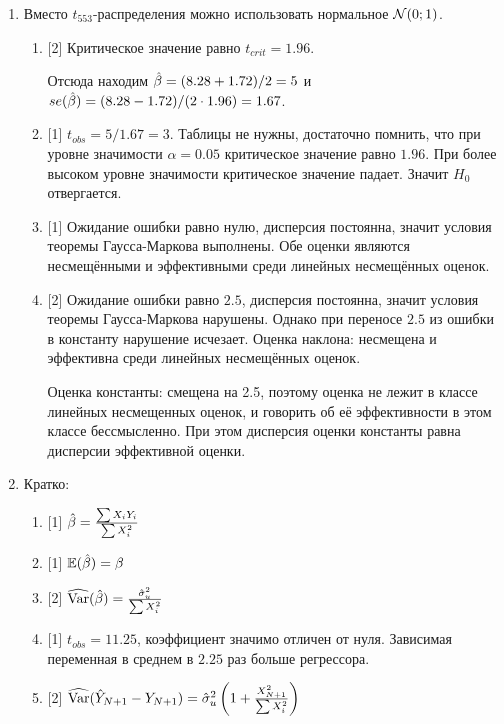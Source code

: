 \begin{enumerate}
    \item Вместо $t_{553}$-распределения можно использовать нормальное $\mathcal{N}(0;1)$.
\begin{enumerate}
    \item {[2]} Критическое значение равно $t_{crit} = 1.96$. 

    Отсюда находим $\hat{\beta} = (8.28 + 1.72)/2=5$ и $se(\hat{\beta}) = (8.28 - 1.72)/(2\cdot 1.96) = 1.67$.
    \item {[1]} $t_{obs} = 5/1.67 = 3$. Таблицы не нужны, достаточно помнить, 
    что при уровне значимости $\alpha=0.05$ критическое значение равно $1.96$. 
    При более высоком уровне значимости критическое значение падает. Значит $H_0$ отвергается. 

    \item {[1]} Ожидание ошибки равно нулю, дисперсия постоянна, значит условия теоремы Гаусса-Маркова выполнены. 
    Обе оценки являются несмещёнными и эффективными среди линейных несмещённых оценок. 

    \item {[2]} Ожидание ошибки равно $2.5$, дисперсия постоянна, значит условия теоремы Гаусса-Маркова нарушены.
    Однако при переносе $2.5$ из ошибки в константу нарушение исчезает. 
    Оценка наклона: несмещена и эффективна среди линейных несмещённых оценок.

    Оценка константы: смещена на 2.5, поэтому оценка не лежит в классе линейных несмещенных оценок, 
    и говорить об её эффективности в этом классе бессмысленно. 
    При этом дисперсия оценки константы равна дисперсии эффективной оценки.

\end{enumerate}

\item Кратко:
\begin{enumerate}
    \item {[1]} $\hat{\beta} = \frac{\sum X_i Y_i}{\sum X_i^2}$
    \item {[1]} $\operatorname{\mathbb{E}}(\hat{\beta}) = \beta$
    \item {[2]} $\operatorname{\widehat{\operatorname{Var}}}(\hat{\beta}) = \frac{\hat\sigma^2_u}{\sum X_i^2}$
    \item {[1]} $t_{obs} = 11.25$, коэффициент значимо отличен от нуля. 
    Зависимая переменная в среднем в $2.25$ раз больше регрессора.
    \item {[2]} $\operatorname{\widehat{\operatorname{Var}}}(\hat Y_{N+1} - Y_{N+1}) = \hat\sigma^2_u \left( 1 + \frac{X_{N+1}^2}{\sum X_i^2}  \right)$
\end{enumerate}


\end{enumerate}
